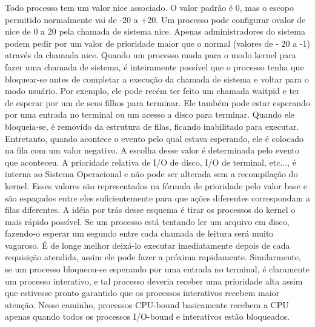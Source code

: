 Todo processo tem um valor nice associado. O valor padrão é 0, mas o escopo permitido normalmente vai de -20 a +20. Um processo pode configurar ovalor de nice de 0 a 20 pela chamada de sistema nice. Apenas administradores do sistema podem pedir por um valor de prioridade maior que o normal (valores de - 20 a -1) através da chamada nice. 
Quando um processo muda para o modo kernel para fazer uma chamada de sistema, é inteiramente possível que o processo tenha que bloquear-se antes de completar a execução da chamada de sistema e voltar para o modo usuário.
Por exemplo, ele pode recém ter feito um chamada waitpid e ter de esperar por um de seus filhos para terminar. Ele também pode estar esperando por uma entrada no terminal ou um acesso a disco para terminar. Quando ele bloqueia-se, é removido da estrutura de filas, ficando inabilitado para executar.
Entretanto, quando acontece o evento pelo qual estava esperando, ele é colocado na fila com um valor negativo. A escolha desse valor é determinada pelo evento que aconteceu. A prioridade relativa de I/O de disco, I/O de terminal, etc..., é interna ao Sistema Operacional e não pode ser alterada sem a recompilação do kernel. Esses valores são representados na fórmula de prioridade pelo valor base e são espaçados entre eles suficientemente para que ações diferentes correspondam a filas diferentes.
A idéia por trás desse esquema é tirar os processos do kernel o mais rápido possível. Se um processo está tentando ler um arquivo em disco, fazendo-o esperar um segundo entre cada chamada de leitura será muito vagaroso. É de longe melhor deixá-lo executar imediatamente depois de cada requisição atendida, assim ele pode fazer a próxima rapidamente. Similarmente, se um processo bloqueou-se esperando por uma entrada no terminal, é claramente um processo interativo, e tal processo deveria receber uma prioridade alta assim que estivesse pronto garantido que os processos interativos recebem maior atenção. Nesse caminho, processos CPU-bound basicamente recebem a CPU apenas quando todos os processos I/O-bound e interativos estão bloqueados.

